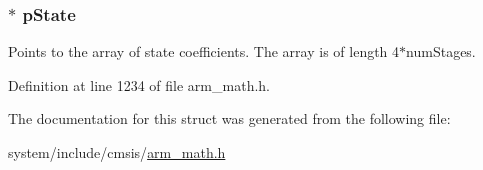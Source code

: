 \subsubsection[{\texorpdfstring{p\+State}{pState}}]{$\ast$ p\+State}\hypertarget{structarm__biquad__casd__df1__inst__q31_adee4ba3ee8869865af7d8fa08ca913d6}{}\label{structarm__biquad__casd__df1__inst__q31_adee4ba3ee8869865af7d8fa08ca913d6}
Points to the array of state coefficients. The array is of length 4$\ast$num\+Stages. 

Definition at line 1234 of file arm\+\_\+math.\+h.



The documentation for this struct was generated from the following file\+:\begin{DoxyCompactItemize}
\item 
system/include/cmsis/\hyperlink{arm__math_8h}{arm\+\_\+math.\+h}\end{DoxyCompactItemize}
